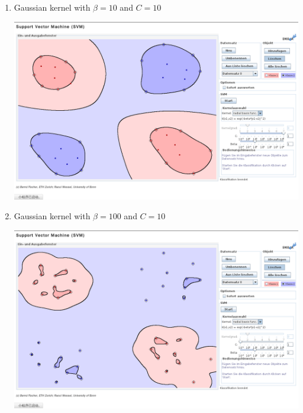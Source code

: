 \documentclass{article}[11pt]
\begin{document}
\begin{enumerate}
\item 
Gaussian kernel with $\beta = 10$ and $C=10$
\begin{center}
  \includegraphics[width=.9\textwidth]{a-rbf-b1-c1}
\end{center}

\item 
Gaussian kernel with $\beta = 100$ and $C=10$
\begin{center}
  \includegraphics[width=.9\textwidth]{a-rbf-b2-c1}
\end{center}

\end{enumerate}
\end{document}
